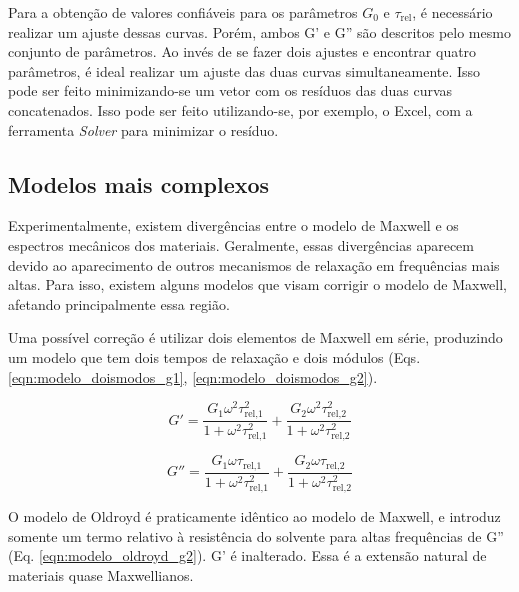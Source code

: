 			Para a obtenção de valores confiáveis para os parâmetros \(G_0\) e \(\tau_{\mathrm{rel}}\), é necessário realizar um ajuste dessas curvas. Porém, ambos G' e G'' são descritos pelo mesmo conjunto de parâmetros. Ao invés de se fazer dois ajustes e encontrar quatro parâmetros, é ideal realizar um ajuste das duas curvas simultaneamente. Isso pode ser feito minimizando-se um vetor com os resíduos das duas curvas concatenados. Isso pode ser feito utilizando-se, por exemplo, o Excel, com a ferramenta \emph{Solver} para minimizar o resíduo.
			

			\subsection{Modelos mais complexos}
			
			Experimentalmente, existem divergências entre o modelo de Maxwell e os espectros mecânicos dos materiais. Geralmente, essas divergências aparecem devido ao aparecimento de outros  mecanismos de relaxação em frequências mais altas. Para isso, existem alguns modelos que visam corrigir o modelo de Maxwell, afetando principalmente essa região.
			
			Uma possível correção é utilizar dois elementos de Maxwell em série, produzindo um modelo que tem dois tempos de relaxação e dois módulos (Eqs. \ref{eqn:modelo_doismodos_g1}, \ref{eqn:modelo_doismodos_g2}). 
			
			\begin{equation}
				G' = \dfrac{ G_1 \omega^2 \tau_{\textrm{rel,1}}^2   }{  1 + \omega^2 \tau_{\textrm{rel,1}}^2      } + \dfrac{ G_2 \omega^2 \tau_{\textrm{rel,2}}^2   }{  1 + \omega^2 \tau_{\textrm{rel,2}}^2      }
			\label{eqn:modelo_doismodos_g1}
			\end{equation}
		
			\begin{equation}
				G'' = \dfrac{  G_1 \omega  \tau_{\textrm{rel,1}}        }{ 1 + \omega^2 \tau_{\textrm{rel,1}}^2 } + \dfrac{  G_2 \omega  \tau_{\textrm{rel,2}}        }{ 1 + \omega^2 \tau_{\textrm{rel,2}}^2 }
			\label{eqn:modelo_doismodos_g2}
			\end{equation}

			O modelo de Oldroyd é praticamente idêntico ao modelo de Maxwell, e introduz somente um termo relativo à resistência do solvente para altas frequências de G'' (Eq. \ref{eqn:modelo_oldroyd_g2}). G' é inalterado. Essa é a extensão natural de materiais quase Maxwellianos. %
			

